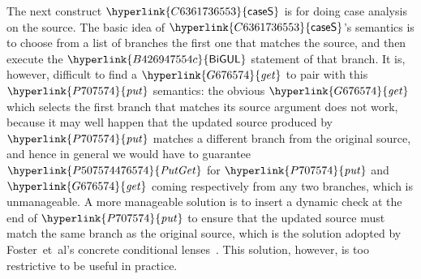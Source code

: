 \documentclass[fleqn]{llncs}
\newcommand{\identifier}[1]{\mathit{#1}}
\newcommand{\constructor}[1]{\mathsf{#1}}
\begin{document}
The next construct \ensuremath{\protect\hyperlink{C6361736553}{\constructor{caseS}}} is for doing case analysis on the source.
The basic idea of \ensuremath{\protect\hyperlink{C6361736553}{\constructor{caseS}}}'s semantics is to choose from a list of branches the first one that matches the source, and then execute the \ensuremath{\protect\hyperlink{B426947554c}{\constructor{BiGUL}}} statement of that branch.
It is, however, difficult to find a \ensuremath{\protect\hyperlink{G676574}{\identifier{get}}} to pair with this \ensuremath{\protect\hyperlink{P707574}{\identifier{put}}} semantics: the obvious \ensuremath{\protect\hyperlink{G676574}{\identifier{get}}} which selects the first branch that matches its source argument does not work, because it may well happen that the updated source produced by \ensuremath{\protect\hyperlink{P707574}{\identifier{put}}} matches a different branch from the original source, and hence in general we would have to guarantee \ensuremath{\protect\hyperlink{P507574476574}{\identifier{PutGet}}} for \ensuremath{\protect\hyperlink{P707574}{\identifier{put}}} and \ensuremath{\protect\hyperlink{G676574}{\identifier{get}}} coming respectively from any two branches, which is unmanageable.
A more manageable solution is to insert a dynamic check at the end of \ensuremath{\protect\hyperlink{P707574}{\identifier{put}}} to ensure that the updated source must match the same branch as the original source, which is the solution adopted by Foster~et~al's concrete conditional lenses~\cite[Section~6.1]{Foster-lenses}.
This solution, however, is too restrictive to be useful in practice.
\end{document}
